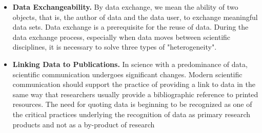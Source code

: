 \begin{itemize}
    \item \textbf{Data Exchangeability.} By data exchange, we mean the ability of two objects, that is, the author of data and the data user, to exchange meaningful data sets. Data exchange is a prerequisite for the reuse of data. During the data exchange process, especially when data moves between scientific disciplines, it is necessary to solve three types of "heterogeneity".
    \item \textbf{Linking Data to Publications.} In science with a predominance of data, scientific communication undergoes significant changes. Modern scientific communication should support the practice of providing a link to data in the same way that researchers usually provide a bibliographic reference to printed resources. The need for quoting data is beginning to be recognized as one of the critical practices underlying the recognition of data as primary research products and not as a by-product of research
\end{itemize}
